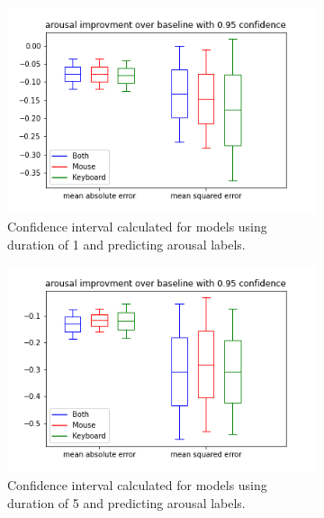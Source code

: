 \begin{figure}[!h]
    \begin{subfigure}[b]{0.31\textwidth}
        \centering
        \includegraphics[width=\textwidth]{figures/results/interval_difference/1/1_arousal_0.95.png}
        \captionsetup{justification=centering}
        \caption{Confidence interval calculated for models using duration of 1 and predicting arousal labels.}
    \end{subfigure}
    \hfill
    \begin{subfigure}[b]{0.31\textwidth}
        \centering
        \includegraphics[width=\textwidth]{figures/results/interval_difference/5/5_arousal_0.95.png}
        \captionsetup{justification=centering}
        \caption{Confidence interval calculated for models using duration of 5 and predicting arousal labels.}
    \end{subfigure}
    \begin{subfigure}[b]{0.31\textwidth}

\end{subfigure}
\end{figure}
